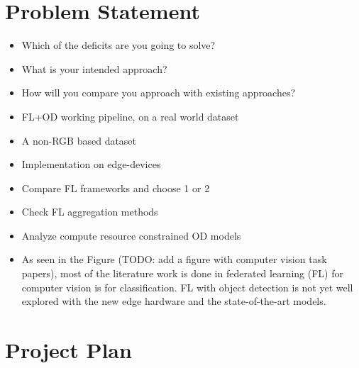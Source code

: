 \documentclass[thesis]{mas_proposal}
\begin{document}
\section{Problem Statement}
\begin{itemize}


      \item Which of the deficits are you going to solve?
      \item What is your intended approach?
      \item How will you compare you approach with existing approaches?
      \item FL+OD working pipeline, on a real world dataset
      \item A non-RGB based dataset
      \item Implementation on edge-devices
      \item Compare FL frameworks and choose 1 or 2
      \item Check FL aggregation methods
      \item Analyze compute resource constrained OD models
      
      \item As seen in the Figure (TODO: add a figure with computer vision task papers), most of the literature work is done in federated learning (FL) for computer vision is for classification. FL with object detection is not yet well explored with the new edge hardware and the state-of-the-art models.


\end{itemize}

\section{Project Plan}
\end{document}

